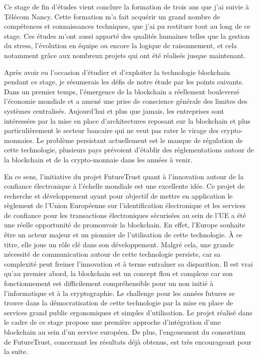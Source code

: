 \documentclass{tnreport}
\begin{document}
Ce stage de fin d'études vient conclure la formation de trois ans que j'ai suivie à Télécom Nancy. Cette formation m'a fait acquérir un grand nombre de compétences et connaissances techniques, que j'ai pu restituer tout au long de ce stage. Ces études m'ont aussi apporté des qualités humaines telles que la gestion du stress, l'évolution en équipe ou encore la logique de raisonnement, et cela notamment grâce aux nombreux projets qui ont été réalisés jusque maintenant.

Après avoir eu l'occasion d'étudier et d'exploiter la technologie blockchain pendant ce stage, je résumerais les défis de notre étude par les points suivants. Dans un premier temps, l'émergence de la blockchain a réellement bouleversé l'économie mondiale et a amené une prise de conscience générale des limites des systèmes centralisés. Aujourd'hui et plus que jamais, les entreprises sont intéressées par la mise en place d'architectures reposant sur la blockchain et plus particulièrement le secteur bancaire qui ne veut pas rater le virage des crypto-monnaies. Le problème persistant actuellement est le manque de régulation de cette technologie, plusieurs pays prévoient d'établir des réglementations autour de la blockchain et de la crypto-monnaie dans les années à venir.

En ce sens, l’initiative du projet FutureTrust quant à l'innovation autour de la confiance électronique à l'échelle mondiale est une excellente idée. 
Ce projet de recherche et développement ayant pour objectif de mettre en application le règlement de l'Union Européenne sur l'identification électronique et les services de confiance pour les transactions électroniques sécurisées au sein de l'UE a été une réelle opportunité de promouvoir la blockchain.
En effet, l'Europe souhaite être un acteur majeur et un pionnier de l'utilisation de cette technologie. À ce titre, elle joue un rôle clé dans son développement.
Malgré cela, une grande nécessité de communication autour de cette technologie persiste, car sa complexité peut freiner l'innovation et à terme entraîner sa disparition.
Il est vrai qu'au premier abord, la blockchain est un concept flou et complexe car son fonctionnement est difficilement compréhensible pour un non initié à l'informatique et à la cryptographie.
Le challenge pour les années futures se trouve dans la démocratisation de cette technologie par la mise en place de services grand public ergonomiques et simples d'utilisation.
Le projet réalisé dans le cadre de ce stage propose une première approche d'intégration d'une blockchain au sein d'un service européen. De plus, l'engouement du consortium de FutureTrust, concernant les résultats déjà obtenus, est très encourageant pour la suite.
\end{document}
